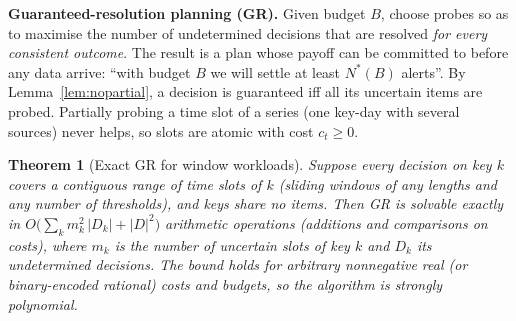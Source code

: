 \documentclass[conference]{IEEEtran}
\newtheorem{theorem}{Theorem}
\begin{document}
\textbf{Guaranteed-resolution planning (GR).} Given budget $B$, choose probes so as to maximise the number of
undetermined decisions that are resolved \emph{for every consistent outcome}. The result is a plan whose payoff can be
committed to before any data arrive: ``with budget $B$ we will settle at least $N^*(B)$ alerts''. By
Lemma~\ref{lem:nopartial}, a decision is guaranteed iff all its uncertain items are probed. Partially probing a time
slot of a series (one key-day with several sources) never helps, so slots are atomic with cost $c_t\ge0$.
\begin{theorem}[Exact GR for window workloads]
\label{thm:dp}
Suppose every decision on key $k$ covers a contiguous range of time slots of $k$ (sliding windows of any lengths and
any number of thresholds), and keys share no items. Then GR is solvable exactly in
$O\big(\sum_k m_k^2\,|D_k| + |D|^2\big)$ arithmetic operations (additions and comparisons on costs), where $m_k$ is the
number of uncertain slots of key $k$ and $D_k$ its undetermined decisions. The bound holds for arbitrary nonnegative
real (or binary-encoded rational) costs and budgets, so the algorithm is strongly polynomial.
\end{theorem}
\end{document}

